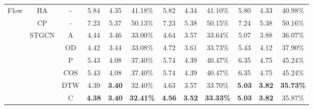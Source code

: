 \begin{table}[t!]
\begin{center}
{\begin{tabular}{c|c|c|ccc|ccc|ccc}
                \multirow{23}{*}{Flow}         & HA                     & -     & 5.84                                  & 4.35                                  & 41.18\%                               & 5.82          & 4.34          & 41.10\%          & 5.80          & 4.33          & 40.98\%          \\
                                               & CP                     & -     & 7.23                                  & 5.37                                  & 50.13\%                               & 7.23          & 5.38          & 50.15\%          & 7.24          & 5.38          & 50.16\%          \\
                \cline{2-12}
                                               & \multirow{7}{*}{STGCN} & A     & 4.44                                  & 3.46                                  & 33.00\%                               & 4.64          & 3.57          & 33.64\%          & 5.07          & 3.88          & 36.07\%          \\
                                               &                        & OD    & 4.42                                  & 3.44                                  & 33.08\%                               & 4.72          & 3.61          & 33.73\%          & 5.43          & 4.12          & 37.90\%          \\
                                               &                        & P     & 5.43                                  & 4.08                                  & 37.40\%                               & 5.74          & 4.39          & 40.47\%          & 6.35          & 4.75          & 45.24\%          \\
                                               &                        & COS   & 5.43                                  & 4.08                                  & 37.40\%                               & 5.74          & 4.39          & 40.47\%          & 6.35          & 4.75          & 45.24\%          \\
                                               &                        & DTW   & 4.39                                  & \textbf{3.40}                         & 32.40\%                               & 4.63          & 3.57          & 33.70\%          & \textbf{5.03} & \textbf{3.82} & \textbf{35.73\%} \\
                                               &                        & C     & \textbf{4.38}                         & \textbf{3.40}                         & \textbf{32.41\%}                      & \textbf{4.56} & \textbf{3.52} & \textbf{33.33\%} & \textbf{5.03} & \textbf{3.82} & 35.87\%          \\

\end{tabular}}
\end{center}
\end{table}
